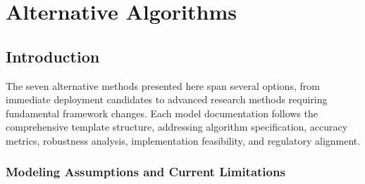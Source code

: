 \chapter{Alternative Algorithms}  \newpage








\section{Introduction}


The seven alternative methods presented here span several options, from immediate deployment candidates to advanced research methods requiring fundamental framework changes. Each model documentation follows the comprehensive template structure, addressing algorithm specification, accuracy metrics, robustness analysis, implementation feasibility, and regulatory alignment.

\subsection{Modeling Assumptions and Current Limitations}
 
